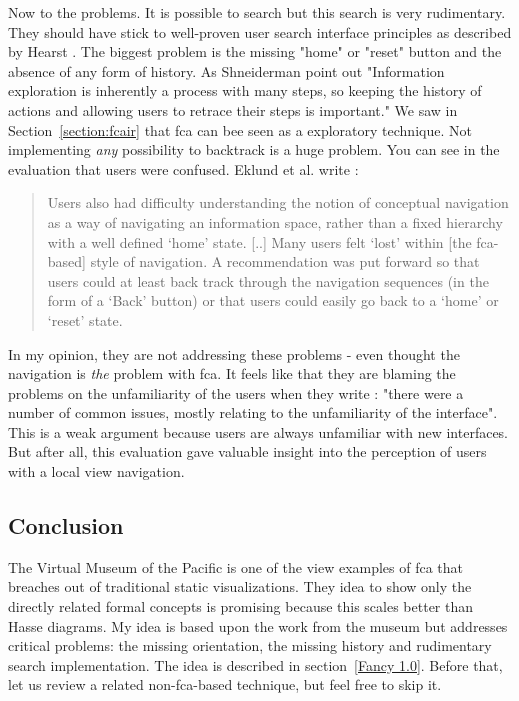 \documentclass[11pt]{report}
\begin{document}
 Now to the problems. It is possible to search but this search is very rudimentary. They should have stick to well-proven user search interface principles as described by Hearst \cite{Hearst2009}. The biggest problem is the missing "home" or "reset" button and the absence of any form of history. As Shneiderman \cite{Shneiderman1996} point out "Information exploration is inherently a process with many steps, so keeping the history of actions and allowing users to retrace their steps is important." We saw in Section~\ref{section:fcair} that \acrshort{fca} can bee seen as a exploratory technique. Not implementing \textit{any} possibility to backtrack is a huge problem. You can see in the evaluation that users were confused. Eklund et al. write \cite{Eklund2012}:
 \begin{quote}
 Users also had difficulty understanding the notion of conceptual navigation as a way of navigating an information space, rather than a fixed hierarchy with a well defined `home' state. [..] Many users felt `lost' within [the \acrshort{fca}-based] style of navigation. A recommendation was put forward so that users could at least back track through the navigation sequences (in the form of a `Back' button) or that users could easily go back to a `home' or `reset' state.
 \end{quote}
  In my opinion, they are not addressing these problems - even thought the navigation is \textit{the} problem with \acrshort{fca}. It feels like that they are blaming the problems on the unfamiliarity of the users when they write \cite{Eklund2012}: "there were a number of common issues, mostly relating to the unfamiliarity of the interface". This is a weak argument because users are always unfamiliar with new interfaces. But after all, this evaluation gave valuable insight into the perception of users with a local view navigation.
  
\subsection{Conclusion}

The Virtual Museum of the Pacific is one of the view examples of \acrshort{fca} that breaches out of traditional static visualizations. They idea to show only the directly related formal concepts is promising because this scales better than Hasse diagrams. My idea is based upon the work from the museum but addresses critical problems: the missing orientation, the missing history and rudimentary search implementation. The idea is described in section~\ref{Fancy 1.0}. Before that, let us review a related non-\acrshort{fca}-based technique, but feel free to skip it. \\
\end{document}
